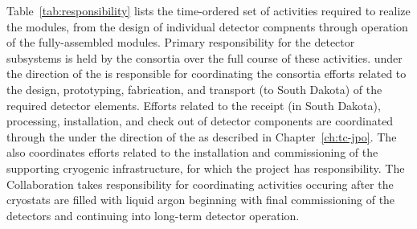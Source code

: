 Table~\ref{tab:responsibility} lists the time-ordered set of activities 
required to realize the   modules, from the design 
of individual detector compnents through operation of the fully-assembled 
modules.  Primary responsibility for the detector subsystems is held 
by the  consortia over the full course of these activities.
  under the direction of the  is 
responsible for coordinating the consortia efforts related to the design, 
prototyping, fabrication, and transport (to South Dakota) of the required 
detector elements.  Efforts related to the receipt (in South Dakota), 
processing, installation, and check out of detector components are 
coordinated through the  under the direction of the  as 
described in Chapter~\ref{ch:tc-jpo}.  The  also coordinates efforts 
related to the installation and commissioning of the supporting cryogenic 
infrastructure, for which the  project has %
responsibility.  
The  Collaboration takes responsibility for coordinating 
activities occuring after the cryostats are filled with liquid argon 
beginning with final commissioning of the detectors and continuing into 
long-term detector operation.

